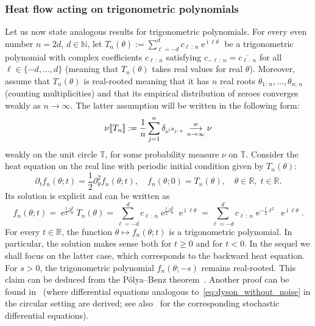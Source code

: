\documentclass[10pt]{amsart}
\theoremstyle{definition}\newtheorem{defi}[theo]{Definition}\newtheorem{rema}[theo]{Remark}\newtheorem{exam}[theo]{Example}\newtheorem{exem}[theo]{Example}\newtheorem{nota}[theo]{Notation}
\newcommand{\llbracket}{\mathopen{[\mkern -2.7mu[}}
\newcommand{\rrbracket}{\mathclose{]\mkern -2.7mu]}}
\newcommand{\lsem}{\llbracket}
\newcommand{\rsem}{\rrbracket}
\DeclareMathOperator{\eee}{e}
\DeclareMathOperator{\ii}{i}
\newcommand{\bT}{\mathbb{T}}
\newcommand{\R}{\mathbb{R}}
\newcommand{\N}{\mathbb{N}}
\newcommand{\toweak}{\overset{w}{\underset{n\to\infty}\longrightarrow}}
\begin{document}
\subsubsection{Heat flow acting on trigonometric polynomials}

Let us now state analogous results for trigonometric polynomials. For every even number $n=2d$, $d\in \N$, let $T_{n} (\theta) := \sum_{\ell= -d}^d c_{\ell\,:\,n} \eee^{\ii \ell \theta}$ be a trigonometric polynomial with complex coefficients $c_{\ell\,:\,n}$ satisfying $c_{-\ell\,:\,n} = \overline{c_{\ell\,:\,n}}$ for all $\ell\in \{-d,\ldots, d\}$ (meaning that $T_n(\theta)$ takes real values for real $\theta$). Moreover, assume that $T_{n}(\theta)$ is real-rooted meaning that it has $n$ real roots $\theta_{1;\,n},\ldots, \theta_{n;\,n}$ (counting multiplicities) and that its empirical distribution of zeroes converges weakly as $n\to\infty$. The latter assumption will be written in the following form:
\begin{equation}\label{eq:empirical_distr_zeroes_conv}
\nu\lsem T_{n}\rsem := \frac {1}{n} \sum_{j=1}^{n} \delta_{\eee^{\ii \theta_{j;\,n}}} \toweak \nu
\end{equation}
weakly on the unit circle $\bT$, for some probability measure $\nu$ on $\bT$. Consider the heat equation on the real line with periodic initial condition given by $T_n(\theta)$:
\begin{equation}\label{eq:heat_equation}
\partial_t f_{n}(\theta; t) = \frac 12 \partial^2_\theta f_{n}(\theta;t),
\quad f_n(\theta; 0) = T_{n}(\theta),
\quad
\theta\in \R, \; t\in \R.
\end{equation}
Its solution is explicit and can be written as
\begin{equation}\label{eq:heat_eq_solution}
f_{n} (\theta; t) =
\eee^{\frac t2 \partial_\theta^2} T_{n}(\theta) =
\sum_{\ell= -d}^d c_{\ell\,:\,n} \eee^{\frac t2 \partial_\theta^2} \eee^{\ii \ell \theta} =
\sum_{\ell = -d}^d c_{\ell\,:\,n} \eee^{-\frac t2 \ell^2} \eee^{\ii \ell \theta}.
\end{equation}
For every $t\in \R$, the function $\theta \mapsto f_{n} (\theta; t)$ is a trigonometric polynomial. In particular, the solution makes sense both for $t\geq 0$ and for $t<0$. In the sequel we shall focus on the latter case, which corresponds to the backward heat equation. For $s>0$, the trigonometric polynomial $f_n(\theta; -s)$ remains real-rooted. This claim can be deduced from the Pólya--Benz theorem~\cite[Corollary~1.3]{aleman_beliaev_hedenmalm}. Another proof can be found in~\cite{tao_blog2} (where differential equations analogous to~\eqref{eq:dyson_without_noise} in the circular setting are derived; see also~\cite{cepa_lepingle_circle,hobson_werner} for the corresponding stochastic differential equations).
\end{document}
